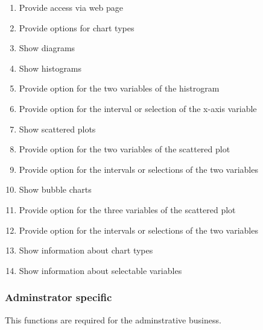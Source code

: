 \begin{enumerate}
  \item Provide access via web page
    
  \item Provide options for chart types
  
  \item Show diagrams
  
  \item Show histograms %
  
  \item Provide option for the two variables of the histrogram
  
  \item Provide option for the interval or selection of the x-axis variable %
  
  \item Show scattered plots %
  
  \item Provide option for the two variables of the scattered plot
  
  \item Provide option for the intervals or selections of the two variables %
  
  
  
  \item Show bubble charts %
  
  \item Provide option for the three variables of the scattered plot
  
  \item Provide option for the intervals or selections of the two variables %
  
  \item Show information about chart types
  
  \item Show information about selectable variables
  
\end{enumerate}


\subsubsection*{Adminstrator specific} 
This functions are required for the adminstrative business.

